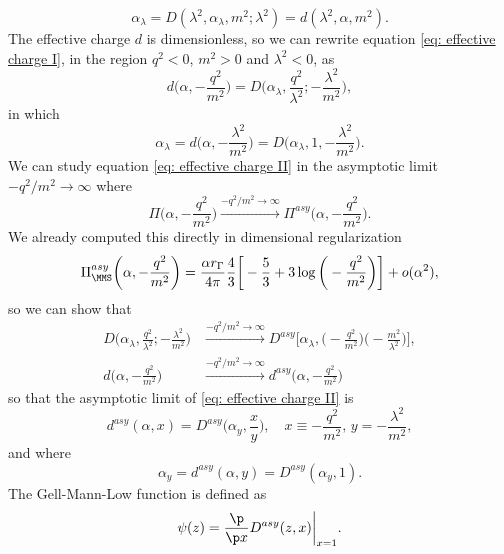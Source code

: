 \begin{equation}
    \alpha_\lambda = D(\lambda^2,\alpha_\lambda,m^2;\lambda^2) = d(\lambda^2,\alpha,m^2).
\end{equation}
The effective charge $d$ is dimensionless, so we can rewrite equation \eqref{eq: effective charge I}, in the region $q^2 < 0$, $m^2 > 0$ and $\lambda^2 < 0$, as
\begin{equation}
\label{eq: effective charge II}
    d\bigg(\alpha,-\frac{q^2}{m^2}\bigg) = D\bigg(\alpha_\lambda,\frac{q^2}{\lambda^2};-\frac{\lambda^2}{m^2}\bigg),
\end{equation}
in which
\begin{equation}
    \alpha_\lambda = d\bigg(\alpha,-\frac{\lambda^2}{m^2}\bigg) = D\bigg(\alpha_\lambda,1,-\frac{\lambda^2}{m^2}\bigg).
\end{equation}
We can study equation \eqref{eq: effective charge II} in the asymptotic limit $-q^2/m^2 \to \infty$ where
\begin{equation}
    \Pi\bigg(\alpha,-\frac{q^2}{m^2}\bigg) \xrightarrow{-q^2/m^2 \to \infty} \Pi^{asy}\bigg(\alpha,-\frac{q^2}{m^2}\bigg).
\end{equation}
We already computed this directly in dimensional regularization
\begin{equation}
    \Pi^{asy}_{\MMS}\bigg(\alpha,-\frac{q^2}{m^2}\bigg) = \frac{\alpha r_\Gamma}{4\pi}\frac{4}{3}\bigg[-\frac{5}{3} + 3\log{\bigg(-\frac{q^2}{m^2}\bigg)}\bigg] + o(\alpha^2),
\end{equation}
so we can show that 
\begin{align}
    D\bigg(\alpha_\lambda,\frac{q^2}{\lambda^2};-\frac{\lambda^2}{m^2}\bigg) &\xrightarrow{-q^2/m^2 \to \infty} D^{asy}\bigg[\alpha_\lambda,\bigg(-\frac{q^2}{m^2}\bigg)\bigg(-\frac{m^2}{\lambda^2}\bigg)\bigg], \\
    d\bigg(\alpha,-\frac{q^2}{m^2}\bigg) &\xrightarrow{-q^2/m^2 \to \infty} d^{asy}\bigg(\alpha,-\frac{q^2}{m^2}\bigg)
\end{align}
so that the asymptotic limit of \eqref{eq: effective charge II} is 
\begin{equation}
    d^{asy}(\alpha,x) = D^{asy}\bigg(\alpha_y,\frac{x}{y}\bigg),\quad x \equiv -\frac{q^2}{m^2},\,y = -\frac{\lambda^2}{m^2},
\end{equation}
and where
\begin{equation}
    \alpha_y = d^{asy}(\alpha,y) = D^{asy}(\alpha_y,1).
\end{equation}
The Gell-Mann-Low function is defined as
\begin{equation}
    \psi(z) = \frac{\p}{\p x}D^{asy}(z,x)\bigg|_{x = 1}.
\end{equation}
